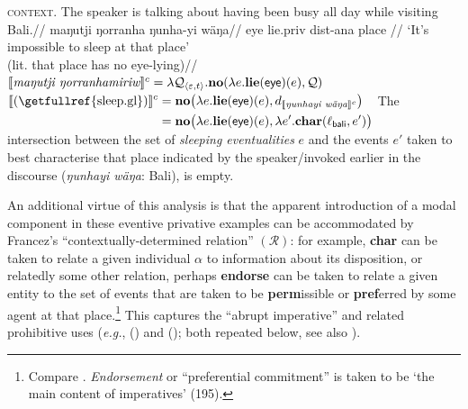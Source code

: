 \pex \a\begingl\glpreamble \textsc{context.} The speaker is talking about having been busy all day while visiting Bali.//
\gla maŋutji ŋorranha ŋunha-yi wäŋa//
\glb eye lie.\IV\textdblhyphen\gls{priv} \gls{dist}-\gls{ana} place //
\glft`It's impossible to sleep at that place'\\(lit. that place has no eye-lying)//\endgl
\a $\denote[c]{\textit{maŋutji ŋorranhamiriw}}=\lambda\mathcal Q_{\langle\varepsilon,t\rangle}.\textbf{no}(\lambda e.\textbf{lie}(\textsf{eye})(e),\mathcal Q)$
\a$ \begin{aligned}[t]
	\denote[c]{\textup{(\getfullref{sleep.gl})}}&=\textbf{no}\big(\lambda e.\textbf{lie}(\textsf{eye})(e),d_{\denote[c]{\textit{ŋunhayi~wäŋa}}}\big)\\
	&=\textbf{no}\big(\lambda e.\textbf{lie}(\textsf{eye})(e),\lambda e'.\textbf{char}(\ell_\textsf{bali},e')\big)
\end{aligned} $
\a The intersection between the set of \textit{sleeping eventualities} $ e $ and the events $ e' $ taken to best characterise that place indicated by the speaker/invoked earlier in the discourse (\textit{ŋunhayi wäŋa}: Bali), is empty.
	\xe


	
	An additional virtue of this analysis is that the apparent introduction of a modal component in these eventive privative examples can be accommodated by Francez's \citeyearpar{Francez2007} ``contextually-determined relation'' $ (\mathcal R) $: for example, \textbf{char} can be taken to relate a given individual $ \alpha $ to information about its disposition, or relatedly some other relation, perhaps \textbf{endorse} can be taken to relate a given entity to the set of events that are taken to be \textbf{perm}issible or \textbf{pref}erred by some agent at that place.\footnote{Compare \citet{Condoravdi2017}. \textit{Endorsement} or ``preferential commitment'' is taken to be `the main content of imperatives' (195).} This captures the ``abrupt imperative'' and related prohibitive uses (\textit{e.g.}, () and (); both repeated below, see also \citealt[448]{Wilkinson1991}).
	

